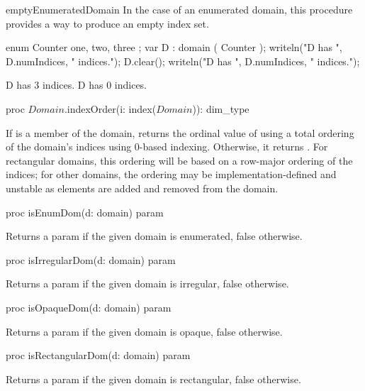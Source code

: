\begin{chapelexample}{emptyEnumeratedDomain}
In the case of an enumerated domain, this procedure provides a way to produce an
empty index set.
\begin{chapel}
enum Counter { one, two, three };
var D : domain ( Counter );
writeln("D has ", D.numIndices, " indices.");
D.clear();
writeln("D has ", D.numIndices, " indices.");
\end{chapel}
\begin{chapeloutput}
D has 3 indices.
D has 0 indices.
\end{chapeloutput}
\end{chapelexample}

\begin{protohead}
proc $Domain$.indexOrder(i: index($Domain$)): dim_type
\end{protohead}
\begin{protobody}
If  is a member of the domain, returns the ordinal value of
 using a total ordering of the domain's indices using 0-based
indexing.  Otherwise, it returns .  For rectangular
domains, this ordering will be based on a row-major ordering of the
indices; for other domains, the ordering may be
implementation-defined and unstable as elements are added and
removed from the domain.
\end{protobody}

\begin{protohead}
proc isEnumDom(d: domain) param
\end{protohead}
\begin{protobody}
Returns a param  if the given domain is enumerated, false otherwise.
\end{protobody}

\begin{protohead}
proc isIrregularDom(d: domain) param
\end{protohead}
\begin{protobody}
Returns a param  if the given domain is irregular, false otherwise.
\end{protobody}

\begin{protohead}
proc isOpaqueDom(d: domain) param
\end{protohead}
\begin{protobody}
Returns a param  if the given domain is opaque, false otherwise.
\end{protobody}

\begin{protohead}
proc isRectangularDom(d: domain) param
\end{protohead}
\begin{protobody}
Returns a param  if the given domain is rectangular, false otherwise.
\end{protobody}

